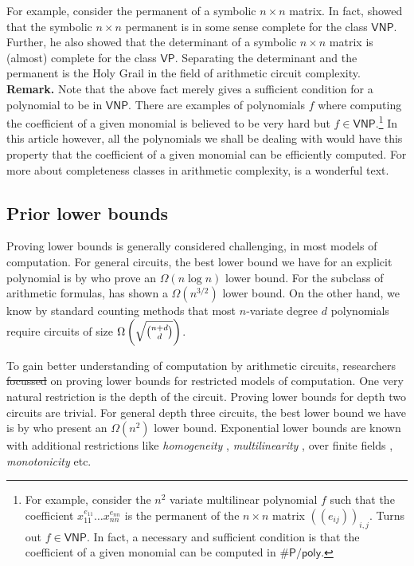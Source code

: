 \documentclass{beatcs}
\newcommand{\poly}{\mathsf{poly}}
\newcommand{\VP}{\mathsf{VP}}
\newcommand{\VNP}{\mathsf{VNP}}
\providecommand{\DIFaddtex}[1]{{\protect\color{blue}\uwave{#1}}} %
\providecommand{\DIFdeltex}[1]{{\protect\color{red}\sout{#1}}}                      %
\providecommand{\DIFaddbegin}{} %
\providecommand{\DIFaddend}{} %
\providecommand{\DIFdelbegin}{} %
\providecommand{\DIFdelend}{} %
\providecommand{\DIFadd}[1]{\texorpdfstring{\DIFaddtex{#1}}{#1}} %
\providecommand{\DIFdel}[1]{\texorpdfstring{\DIFdeltex{#1}}{}} %
\begin{document}
For example, consider the permanent of a symbolic $n\times n$ matrix. In fact, \cite{v79} showed that the symbolic $n\times n$ permanent is in some sense complete for the class $\VNP$. Further, he also showed that the determinant of a symbolic  $n\times n$ matrix is (almost) complete for the class $\VP$. Separating the determinant and the permanent is the Holy Grail in the field of arithmetic circuit complexity. \\

{\bf Remark.} Note that the above fact merely gives a sufficient condition for a polynomial to be in $\VNP$. There are examples of polynomials $f$ where computing the coefficient of a given monomial is believed to be very hard but $f\in \VNP$.\footnote{For example, consider the $n^2$ variate multilinear polynomial $f$ such that the coefficient $x_{11}^{e_{11}}\dots x_{nn}^{e_{nn}}$ is the permanent of the $n\times n$ matrix $(\!(e_{ij})\!)_{i,j}$. Turns out $f \in \VNP$. In fact, a necessary and sufficient condition is that the coefficient of a given monomial can be computed in $\#\mathsf{P}/\poly$. }  In this article however, all the polynomials we shall be dealing with would have this property that the coefficient of a given monomial can be efficiently computed. For more about completeness classes in arithmetic complexity, \cite{bcs97} is a wonderful text. 


\subsection{Prior lower bounds}

Proving lower bounds is generally considered challenging, in most models of computation. For general circuits, the best lower bound we have for an explicit polynomial is by \cite{BS83} who prove an $\Omega(n\log n)$ lower bound. For the subclass of arithmetic formulas, \cite{k85} has shown a $\Omega(n^{3/2})$ lower bound. On the other hand, we know by standard counting methods that most $n$-variate degree $d$ polynomials require circuits of size $\Omega\left(\sqrt{\binom{n+d}{d}}\right)$.

To gain better understanding of computation by arithmetic circuits, researchers \DIFdelbegin \DIFdel{focussed }\DIFdelend \DIFaddbegin \DIFadd{focused }\DIFaddend on proving lower bounds for restricted models of computation. One very natural restriction is the depth of the circuit. Proving lower bounds for depth two circuits are trivial. For general depth three circuits, the best lower bound we have is by \cite{sw2001} who present an $\Omega(n^2)$ lower bound. Exponential lower bounds are known with additional restrictions like \emph{homogeneity} \cite{nw1997}, \emph{multilinearity} \cite{raz2004,raz-yehudayoff}, over finite fields \cite{gr00,grigoriev98}, \emph{monotonicity} \cite{js82} etc. 
\end{document}
